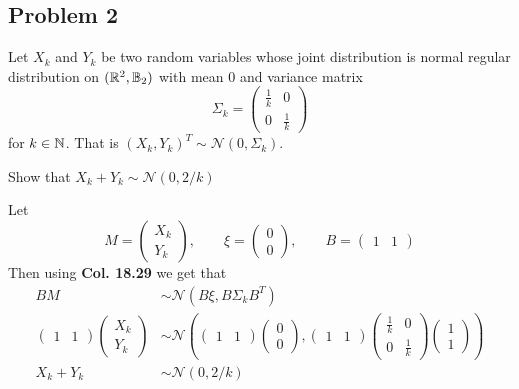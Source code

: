 \subsection{Problem 2} %
Let \(X_k\) and \(Y_k\) be two random variables whose joint distribution is normal regular distribution on \(({\mathbb{R}}^2,{\mathbb{B}}_2)\) with mean \(0\) and variance matrix
\[
	\Sigma_k =
	\begin{pmatrix}
	\frac{1}{k} & 0 \\
	0 & \frac{1}{k}
	\end{pmatrix}
\]
for \(k\in {\mathbb{N}}\). That is \((X_k,Y_k)^T\sim\mathcal{N}(0,\Sigma_k)\).
\begin{problem}
Show that \(X_k+Y_k\sim\mathcal{N}(0,2/k)\)
\end{problem}
\begin{solution}
Let
\[
    M=\begin{pmatrix}
	   X_k \\
	   Y_k
	   \end{pmatrix},
	\qquad
	\xi = \begin{pmatrix}
	0 \\
	0
	\end{pmatrix},
	\qquad
   B = \begin{pmatrix}
       1 & 1
   \end{pmatrix}
\]
Then using \textbf{Col. 18.29} we get that
\begin{align}
    BM & \sim\mathcal{N}(B\xi,B\Sigma_kB^T) \\
    \begin{pmatrix}
    1 & 1
    \end{pmatrix}
    \begin{pmatrix}
	   X_k \\
	   Y_k
	   \end{pmatrix}&\sim\mathcal{N}\left(
	   \begin{pmatrix}
    1 & 1
    \end{pmatrix}
    \begin{pmatrix}
	0 \\
	0
	\end{pmatrix},
\begin{pmatrix}
       1 & 1
   \end{pmatrix}
   \begin{pmatrix}
	\frac{1}{k} & 0 \\
	0 & \frac{1}{k}
	\end{pmatrix}
	\begin{pmatrix}
	1 \\
	1
	\end{pmatrix}
	\right) \\
    X_k+Y_k &\sim \mathcal{N}(0,2/k)
\end{align}
\end{solution}
